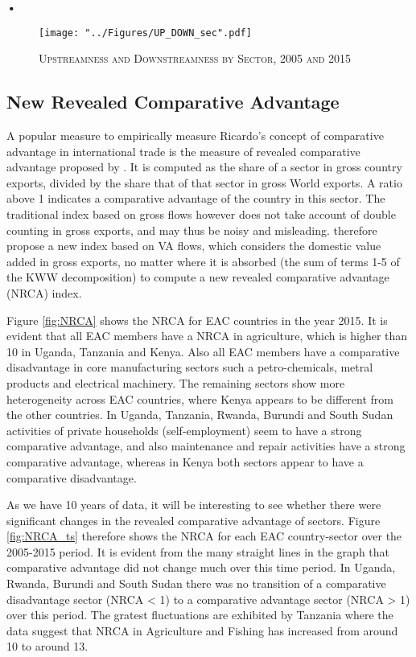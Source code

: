 \textbf{\textbf{•}}\documentclass[a4paper]{article}
\begin{document}
\begin{figure}[h!]
\centering
\caption{\label{fig:UP_DOWN_sec}\textsc{Upstreamness and Downstreamness by Sector, 2005 and 2015}}
\texttt{[image: "../Figures/UP\_DOWN\_sec".pdf]} %
\end{figure}
\FloatBarrier

\subsection{New Revealed Comparative Advantage}
A popular measure to empirically measure Ricardo's concept of comparative advantage in international trade is the measure of revealed comparative advantage proposed by \citet{balassa1965trade}. It is computed as the share of a sector in gross country exports, divided by the share that of that sector in gross World exports. A ratio above 1 indicates a comparative advantage of the country in this sector. The traditional index based on gross flows however does not take account of double counting in gross exports, and may thus be noisy and misleading. \citet{koopman2014tracing} therefore propose a new index based on VA flows, which considers the domestic value added in gross exports, no matter where it is absorbed (the sum of terms 1-5 of the KWW decomposition) to compute a new revealed comparative advantage (NRCA) index. \newline

Figure \ref{fig:NRCA} shows the NRCA for EAC countries in the year 2015. It is evident that all EAC members have a NRCA in agriculture, which is higher than 10 in Uganda, Tanzania and Kenya. Also all EAC members have a comparative disadvantage in core manufacturing sectors such a petro-chemicals, metral products and electrical machinery. The remaining sectors show more heterogeneity across EAC countries, where Kenya appears to be different from the other countries. In Uganda, Tanzania, Rwanda, Burundi and South Sudan activities of private households (self-employment) seem to have a strong comparative advantage, and also maintenance and repair activities have a strong comparative advantage, whereas in Kenya both sectors appear to have a comparative disadvantage. \newline

As we have 10 years of data, it will be interesting to see whether there were significant changes in the revealed comparative advantage of sectors. Figure \ref{fig:NRCA_ts} therefore shows the NRCA for each EAC country-sector over the 2005-2015 period. It is evident from the many straight lines in the graph that comparative advantage did not change much over this time period. In Uganda, Rwanda, Burundi and South Sudan there was no transition of a comparative disadvantage sector (NRCA < 1) to a comparative advantage sector (NRCA > 1) over this period. The gratest fluctuations are exhibited by Tanzania where the data suggest that NRCA in Agriculture and Fishing has increased from around 10 to around 13. 
\end{document}
